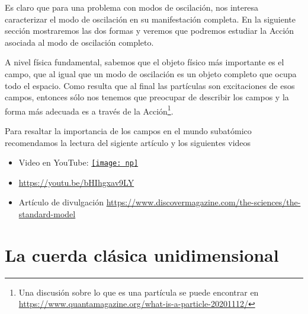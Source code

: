 Es claro que para una problema con modos de oscilación, nos interesa caracterizar el modo de oscilación en su manifestación completa. En la siguiente sección mostraremos las dos formas y veremos que  podremos  estudiar la Acción asociada al modo de oscilación completo.

A nivel física fundamental, sabemos que el objeto físico más importante es el campo, que al igual que un modo de oscilación es un objeto completo que ocupa todo el espacio.
Como resulta que al final las partículas son excitaciones de esos campos, entonces sólo nos tenemos que preocupar de describir los campos y la forma más adecuada es
a través de la Acción\footnote{Una discusión sobre lo que es una partícula se puede encontrar en \url{https://www.quantamagazine.org/what-is-a-particle-20201112/}}.

Para resaltar la importancia de los campos en el mundo subatómico recomendamos la lectura del sigiente artículo y los siguientes videos
\begin{itemize}
\item Video en YouTube: \href{kk.org}{\texttt{[image: np]}}
\item \url{https://youtu.be/bHIhgxav9LY}
\item Artículo de divulgación \url{https://www.discovermagazine.com/the-sciences/the-standard-model}
\end{itemize}



\section{La cuerda cl\'asica unidimensional}
\label{sec:la-cuerda-clasica}

